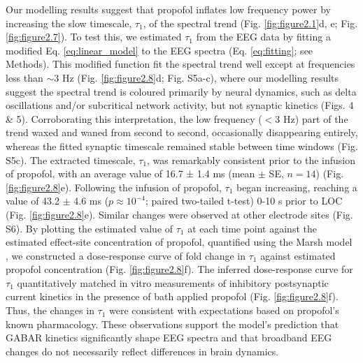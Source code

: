 Our modelling results suggest that propofol inflates low frequency power by increasing the slow timescale, $\tau_1$, of the spectral trend (Fig. \ref{fig:figure2.1}d, e; Fig. \ref{fig:figure2.7}). To test this, we estimated $\tau_1$ from the EEG data by fitting a modified Eq. \ref{eq:linear_model} to the EEG spectra (Eq. \ref{eq:fitting}; see Methods). This modified function fit the spectral trend well except at frequencies less than ${\sim}3$ \unit{\hertz} (Fig. \ref{fig:figure2.8}d; Fig. S5a-c), where our modelling results suggest the spectral trend is coloured primarily by neural dynamics, such as delta oscillations and/or subcritical network activity, but not synaptic kinetics (Figs. 4 \& 5). Corroborating this interpretation, the low frequency ($<3$ \unit{\hertz}) part of the trend waxed and waned from second to second, occasionally disappearing entirely, whereas the fitted synaptic timescale remained stable between time windows (Fig. S5c). The extracted timescale, $\tau_1$, was remarkably consistent prior to the infusion of propofol, with an average value of 16.7 ± 1.4 ms (mean $\pm$ SE, $n=14$) (Fig. \ref{fig:figure2.8}e). Following the infusion of propofol, $\tau_1$ began increasing, reaching a value of 43.2 $\pm$ 4.6 \unit{\milli\second} ($p \approx 10^{-4}$; paired two-tailed t-test) 0-10 \unit{\second} prior to LOC (Fig. \ref{fig:figure2.8}e). Similar changes were observed at other electrode sites (Fig. S6). By plotting the estimated value of $\tau_1$ at each time point against the estimated effect-site concentration of propofol, quantified using the Marsh model \cite{Marsh1991}, we constructed a dose-response curve of fold change in $\tau_1$ against estimated propofol concentration (Fig. \ref{fig:figure2.8}f). The inferred dose-response curve for $\tau_1$ quantitatively matched in vitro measurements of inhibitory postsynaptic current kinetics in the presence of bath applied propofol \cite{Kitamura2003, Orser1994, Whittington1996} (Fig. \ref{fig:figure2.8}f). Thus, the changes in $\tau_1$ were consistent with expectations based on propofol’s known pharmacology. These observations support the model’s prediction that GABAR kinetics significantly shape EEG spectra and that broadband EEG changes do not necessarily reflect differences in brain dynamics. 


